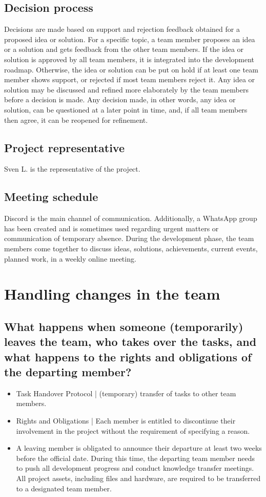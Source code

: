 \subsection{Decision process}
Decisions are made based on support and rejection feedback obtained for a proposed idea or solution.
For a specific topic, a team member proposes an idea or a solution and gets feedback from the other team members.
If the idea or solution is approved by all team members, it is integrated into the development roadmap.
Otherwise, the idea or solution can be put on hold if at least one team member shows support, or rejected if most team members reject it.
Any idea or solution may be discussed and refined more elaborately by the team members before a decision is made.
Any decision made, in other words, any idea or solution, can be questioned at a later point in time, and, if all team members then agree, it can be reopened for refinement.
\subsection{Project representative}
Sven L. is the representative of the project.
\subsection{Meeting schedule}
Discord is the main channel of communication.
Additionally, a WhatsApp group has been created and is sometimes used regarding urgent matters or communication of temporary absence.
During the development phase, the team members come together to discuss ideas, solutions, achievements, current events, planned work, in a weekly online meeting.

\section{Handling changes in the team}
\subsection{What happens when someone (temporarily) leaves the team, who takes over the tasks, and what happens to the rights and obligations of the departing member?}
\begin{itemize}
    \item Task Handover Protocol | (temporary) transfer of tasks to other team members.
    \item Rights and Obligations | Each member is entitled to discontinue their involvement in the project without the requirement of specifying a reason.
    \item A leaving member is obligated to announce their departure at least two weeks before the official date. During this time, the departing team member needs to push all development progress and conduct knowledge transfer meetings. All project assets, including files and hardware, are required to be transferred to a designated team member.
\end{itemize}
